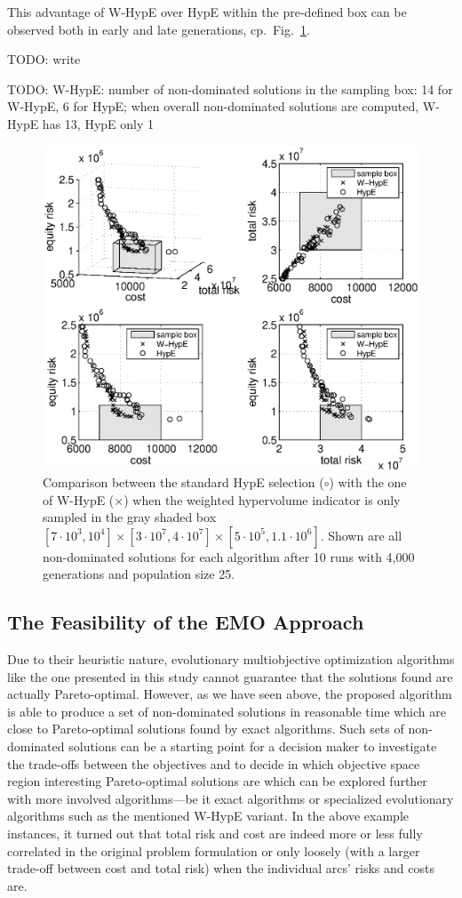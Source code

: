 \documentclass[preprint,12pt]{elsarticle}
\newcommand{\TODO}[1]{{\color{red}TODO: #1}}
\begin{document}
This advantage of W-HypE over HypE within the pre-defined box can be observed both in early and late generations, cp.\ Fig.~\ref{fig:whype}.

\TODO{write}

\TODO{W-HypE: number of non-dominated solutions in the sampling box: 14 for W-HypE, 6 for HypE; when overall non-dominated solutions are computed, W-HypE has 13, HypE only 1}

\begin{figure}
	\centering
	\includegraphics[width=0.75\columnwidth]{../experiments/randVsCost/WHypEVsHypE_ns4_1_OriginalCosts2.eps}
	\vspace{-1em}
	\caption{\label{fig:whype} Comparison between the standard HypE selection ($\circ$) with the one of W-HypE ($\times$) when the weighted hypervolume indicator is only sampled in the gray shaded box $[7\cdot 10^3, 10^4]\times[3\cdot 10^7, 4\cdot 10^7]\times[5\cdot 10^5, 1.1\cdot 10^6]$. Shown are all non-dominated solutions for each algorithm after 10 runs with 4,000 generations and population size 25.}
\end{figure}


\subsection{The Feasibility of the EMO Approach}
Due to their heuristic nature, evolutionary multiobjective optimization algorithms like the one presented in this study cannot guarantee that the solutions found are actually Pareto-optimal. However, as we have seen above, the proposed algorithm is able to produce a set of non-dominated solutions in reasonable time which are close to Pareto-optimal solutions found by exact algorithms. Such sets of non-dominated solutions can be a starting point for a decision maker to investigate the trade-offs between the objectives and to decide in which objective space region interesting Pareto-optimal solutions are which can be explored further with more involved algorithms---be it exact algorithms or specialized evolutionary algorithms such as the mentioned W-HypE variant. In the above example instances, it turned out that total risk and cost are indeed more or less fully correlated in the original problem formulation or only loosely (with a larger trade-off between cost and total risk) when the individual arcs' risks and costs are.
\end{document}
